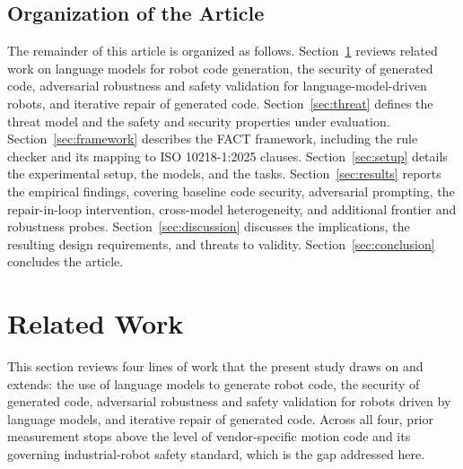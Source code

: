 \documentclass{ieeeaccess}
\begin{document}
\subsection{Organization of the Article}\label{sec:organization}
The remainder of this article is organized as follows. Section~\ref{sec:related}
reviews related work on language models for robot code generation, the security of
generated code, adversarial robustness and safety validation for
language-model-driven robots, and iterative repair of generated code. Section~\ref{sec:threat}
defines the threat model and the safety and security properties under evaluation.
Section~\ref{sec:framework} describes the FACT framework, including the rule checker and its mapping to ISO 10218-1:2025 clauses. Section~\ref{sec:setup}
details the experimental setup, the models, and the tasks. Section~\ref{sec:results}
reports the empirical findings, covering baseline code security, adversarial prompting,
the repair-in-loop intervention, cross-model heterogeneity, and additional
frontier and robustness probes. Section~\ref{sec:discussion} discusses the
implications, the resulting design requirements, and threats to validity.
Section~\ref{sec:conclusion} concludes the article.

\section{Related Work}\label{sec:related}
This section reviews four lines of work that the present study draws on and
extends: the use of language models to generate robot code, the security of
generated code, adversarial robustness and safety validation for robots driven
by language models, and iterative repair of generated code. Across all four,
prior measurement stops above the level of vendor-specific motion code and its
governing industrial-robot safety standard, which is the gap addressed here.
\end{document}
